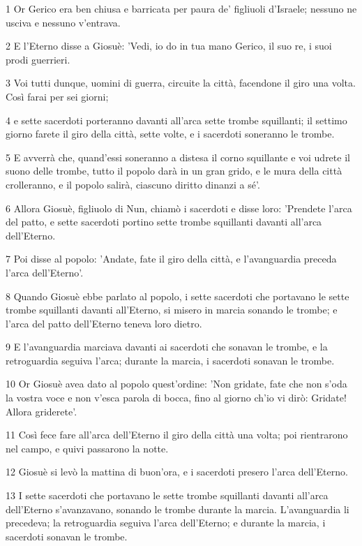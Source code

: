 \par 1 Or Gerico era ben chiusa e barricata per paura de' figliuoli d'Israele; nessuno ne usciva e nessuno v'entrava.
\par 2 E l'Eterno disse a Giosuè: 'Vedi, io do in tua mano Gerico, il suo re, i suoi prodi guerrieri.
\par 3 Voi tutti dunque, uomini di guerra, circuite la città, facendone il giro una volta. Così farai per sei giorni;
\par 4 e sette sacerdoti porteranno davanti all'arca sette trombe squillanti; il settimo giorno farete il giro della città, sette volte, e i sacerdoti soneranno le trombe.
\par 5 E avverrà che, quand'essi soneranno a distesa il corno squillante e voi udrete il suono delle trombe, tutto il popolo darà in un gran grido, e le mura della città crolleranno, e il popolo salirà, ciascuno diritto dinanzi a sé'.
\par 6 Allora Giosuè, figliuolo di Nun, chiamò i sacerdoti e disse loro: 'Prendete l'arca del patto, e sette sacerdoti portino sette trombe squillanti davanti all'arca dell'Eterno.
\par 7 Poi disse al popolo: 'Andate, fate il giro della città, e l'avanguardia preceda l'arca dell'Eterno'.
\par 8 Quando Giosuè ebbe parlato al popolo, i sette sacerdoti che portavano le sette trombe squillanti davanti all'Eterno, si misero in marcia sonando le trombe; e l'arca del patto dell'Eterno teneva loro dietro.
\par 9 E l'avanguardia marciava davanti ai sacerdoti che sonavan le trombe, e la retroguardia seguiva l'arca; durante la marcia, i sacerdoti sonavan le trombe.
\par 10 Or Giosuè avea dato al popolo quest'ordine: 'Non gridate, fate che non s'oda la vostra voce e non v'esca parola di bocca, fino al giorno ch'io vi dirò: Gridate! Allora griderete'.
\par 11 Così fece fare all'arca dell'Eterno il giro della città una volta; poi rientrarono nel campo, e quivi passarono la notte.
\par 12 Giosuè si levò la mattina di buon'ora, e i sacerdoti presero l'arca dell'Eterno.
\par 13 I sette sacerdoti che portavano le sette trombe squillanti davanti all'arca dell'Eterno s'avanzavano, sonando le trombe durante la marcia. L'avanguardia li precedeva; la retroguardia seguiva l'arca dell'Eterno; e durante la marcia, i sacerdoti sonavan le trombe.
